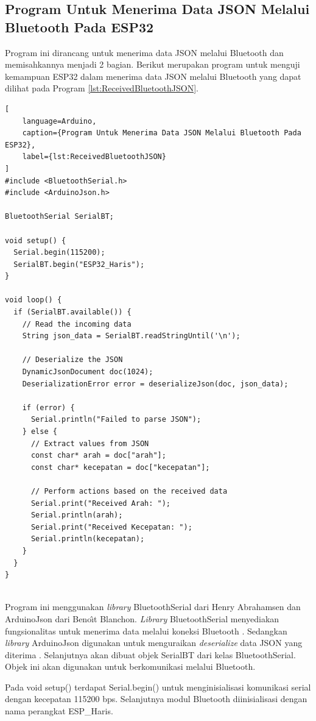 \subsection{Program Untuk Menerima Data JSON Melalui Bluetooth Pada ESP32}

Program ini dirancang untuk menerima data JSON melalui Bluetooth dan memisahkannya menjadi 2 bagian. Berikut merupakan program untuk menguji kemampuan ESP32 dalam menerima data JSON melalui Bluetooth yang dapat dilihat pada Program \ref{lst:ReceivedBluetoothJSON}. 

\begin{lstlisting}[
    language=Arduino,
    caption={Program Untuk Menerima Data JSON Melalui Bluetooth Pada ESP32},
    label={lst:ReceivedBluetoothJSON}
]
#include <BluetoothSerial.h>
#include <ArduinoJson.h>

BluetoothSerial SerialBT;

void setup() {
  Serial.begin(115200);
  SerialBT.begin("ESP32_Haris");
}

void loop() {
  if (SerialBT.available()) {
    // Read the incoming data
    String json_data = SerialBT.readStringUntil('\n');

    // Deserialize the JSON
    DynamicJsonDocument doc(1024);
    DeserializationError error = deserializeJson(doc, json_data);

    if (error) {
      Serial.println("Failed to parse JSON");
    } else {
      // Extract values from JSON
      const char* arah = doc["arah"];
      const char* kecepatan = doc["kecepatan"];

      // Perform actions based on the received data
      Serial.print("Received Arah: ");
      Serial.println(arah);
      Serial.print("Received Kecepatan: ");
      Serial.println(kecepatan);
    }
  }
}
    
\end{lstlisting}

Program ini menggunakan \emph{library} BluetoothSerial dari Henry Abrahamsen dan ArduinoJson dari Beno\^{\i}t Blanchon. \emph{Library} BluetoothSerial menyediakan fungsionalitas untuk menerima data melalui koneksi Bluetooth \parencite{Abrahamsen_2023}. Sedangkan \emph{library} ArduinoJson digunakan untuk menguraikan \emph{deserialize} data JSON yang diterima \parencite{blanchon2021mastering}. Selanjutnya akan dibuat objek SerialBT dari kelas BluetoothSerial. Objek ini akan digunakan untuk berkomunikasi melalui Bluetooth.

Pada void setup() terdapat Serial.begin() untuk menginisialisasi komunikasi serial dengan kecepatan 115200 bps. Selanjutnya modul Bluetooth diinisialisasi dengan nama perangkat ESP\_Haris.

